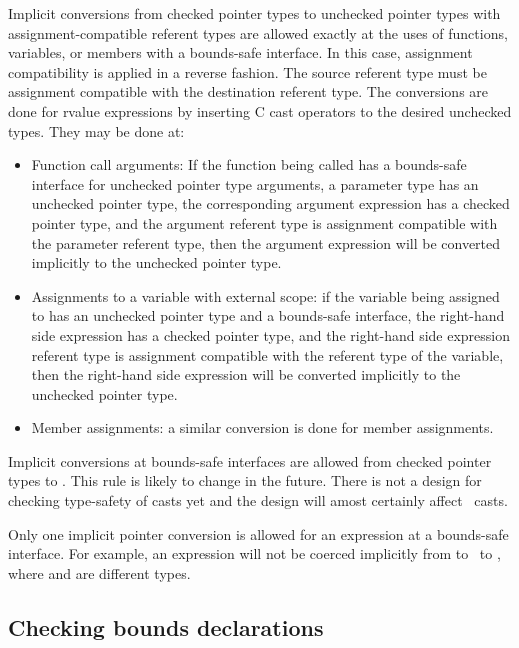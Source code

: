 Implicit conversions from checked pointer types to unchecked pointer types
with assignment-compatible referent types are allowed exactly at the uses of functions,
variables, or members with a  bounds-safe interface.  In this case, assignment
compatibility is applied in a reverse fashion.  The source referent type must be
assignment compatible with the destination referent type.  The conversions are
done for rvalue expressions by inserting C cast operators to the desired unchecked types.
They may be done at:
\begin{itemize}
\item Function call arguments: If the function being called has a
      bounds-safe interface for unchecked pointer type arguments, a parameter
      type has an unchecked pointer type, the corresponding argument expression
      has a checked pointer type, and the argument referent type is assignment
      compatible with the parameter referent type, then the argument expression
      will be converted implicitly to the unchecked pointer type.
\item Assignments to a variable with external scope: if the variable being
     assigned to has an unchecked pointer type and a bounds-safe interface, the
     right-hand side expression has a checked pointer type, and the right-hand
     side expression referent type is assignment compatible with the referent
     type of the variable, then the right-hand side expression will be converted
     implicitly to the unchecked pointer type.
\item
   Member assignments: a similar conversion is done for member assignments.
\end{itemize}

Implicit conversions at bounds-safe interfaces are allowed from checked pointer types to
\uncheckedptrvoid.  This rule is likely to change in the future.  There is not a  design for
checking type-safety of casts yet and the design will amost certainly affect 
\uncheckedptrvoid\ casts.

Only one implicit pointer conversion is allowed for an expression at a bounds-safe
interface.  For example, an expression will not be
coerced implicitly from  to \uncheckedptrvoid\ to
, where  and  are different types.

\subsection{Checking bounds declarations}
\label{section:checking-bounds-interfaces}

